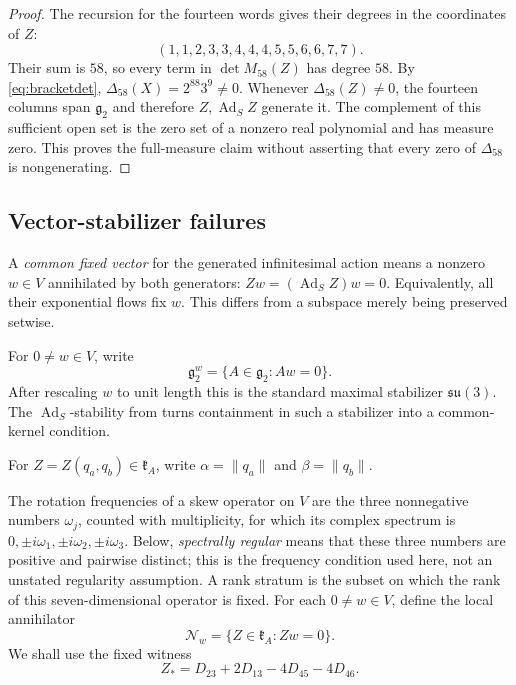 \documentclass[11pt,a4paper]{article}
\newcommand{\Ad}{\operatorname{Ad}}
\begin{document}
\begin{proof}
The recursion for the fourteen words gives their degrees in the coordinates of $Z$:
\[
(1,1,2,3,3,4,4,4,5,5,6,6,7,7).
\]
Their sum is $58$, so every term in $\det M_{58}(Z)$ has degree $58$.
By \eqref{eq:bracketdet}, $\Delta_{58}(X)=2^{88}3^9\ne0$.
Whenever $\Delta_{58}(Z)\ne0$, the fourteen columns span $\mathfrak g_2$ and
therefore $Z,\Ad_SZ$ generate it.  The complement of this sufficient open set
is the zero set of a nonzero real polynomial and has measure zero.
This proves the full-measure claim without asserting that every zero of
$\Delta_{58}$ is nongenerating.
\end{proof}

\subsection{Vector-stabilizer failures}
A \emph{common fixed vector} for the generated infinitesimal action means a nonzero $w\in V$ annihilated by both generators: $Zw=(\operatorname{Ad}_S Z)w=0$.  Equivalently, all their exponential flows fix $w$.  This differs from a subspace merely being preserved setwise.

For $0\ne w\in V$, write
\[
\mathfrak g_2^w=\{A\in\mathfrak g_2:Aw=0\}.
\]
After rescaling $w$ to unit length this is the standard maximal stabilizer $\mathfrak{su}(3)$.  The $\Ad_S$-stability from  turns containment in such a stabilizer into a common-kernel condition.

For $Z=Z(q_a,q_b)\in\mathfrak k_A$, write $\alpha=\|q_a\|$ and $\beta=\|q_b\|$.

The rotation frequencies of a skew operator on $V$ are the three nonnegative numbers $\omega_j$, counted with multiplicity, for which its complex spectrum is $0,\pm i\omega_1,\pm i\omega_2,\pm i\omega_3$.  Below, \emph{spectrally regular} means that these three numbers are positive and pairwise distinct; this is the frequency condition used here, not an unstated regularity assumption.  A rank stratum is the subset on which the rank of this seven-dimensional operator is fixed.
For each $0\ne w\in V$, define the local annihilator
\[
\mathcal N_w=\{Z\in\mathfrak k_A:Zw=0\}.
\]
We shall use the fixed witness
\begin{equation}
Z_*=D_{23}+2D_{13}-4D_{45}-4D_{46}.
\label{eq:su3-witness}
\end{equation}
\end{document}
